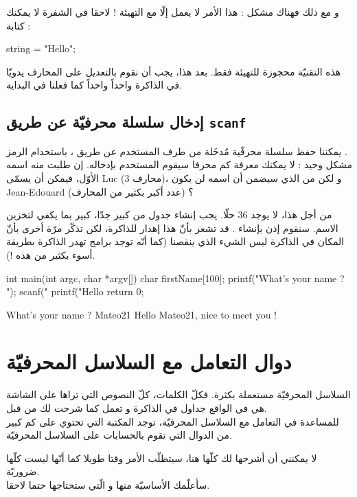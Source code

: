 و مع ذلك فهناك مشكل : هذا الأمر لا يعمل إلّا مع التهيئة ! لاحقا في الشفرة لا يمكنك كتابة :
\begin{Csource}
string = "Hello";
\end{Csource}
هذه التقنيّة محجوزة للتهيئة فقط. بعد هذا، يجب أن نقوم بالتعديل على المحارف يدويّا في الذاكرة واحداً واحداً كما فعلنا في البداية.

\subsection{إدخال سلسلة محرفيّة عن طريق
\texttt{scanf}}
يمكننا حفظ سلسلة محرفّية مُدخَلة من طرف المستخدم عن طريق
،
باستخدام الرمز
.\\
مشكل وحيد : لا يمكنك معرفة كم محرفا سيقوم المستخدم بإدخاله. إن طلبت منه اسمه الأوّل، فيمكن أن يسمّى
\textenglish{Luc}
(3 محارف)، و لكن من الذي سيضمن أن اسمه لن يكون
\textenglish{Jean-Edouard}
(عدد أكبر بكثير من المحارف) ؟

من أجل هذا، لا يوجد 36 حلّا. يجب إنشاء جدول من
كبير جدّا، كبير بما يكفي لتخزين الاسم. سنقوم إذن بإنشاء
.
قد تشعر بأنّ هذا إهدار للذاكرة، لكن تذكّر مرّة أخرى بأنّ المكان في الذاكرة ليس الشيء الذي ينقصنا
(كما أنّه توجد برامج تهدر الذاكرة بطريقة أسوء بكثير من هذه !).
\begin{Csource}
int main(int argc, char *argv[])
{
	char firstName[100];
	printf("What’s your name ? ");
	scanf("%
	printf("Hello %
	return 0;
}
\end{Csource}
\begin{Console}
What's your name ? Mateo21
Hello Mateo21, nice to meet you !
\end{Console}

\section{دوال التعامل مع السلاسل المحرفيّة}
السلاسل المحرفيّة مستعملة بكثرة. فكلّ الكلمات، كلّ النصوص التي تراها على الشاشة هي في الواقع جداول
في الذاكرة و تعمل كما شرحت لك من قبل.\\
للمساعدة في التعامل مع السلاسل المحرفيّة، توجد المكتبة
التي تحتوي على كم كبير من الدوال التي تقوم بالحسابات على السلاسل المحرفيّة.

لا يمكنني أن أشرحها لك كلّها هنا، سيتطلّب الأمر وقتا طويلا كما أنّها ليست كلّها ضروريّة.\\
سأعلّمك الأساسيّة منها و الّتي ستحتاجها حتما لاحقا.

